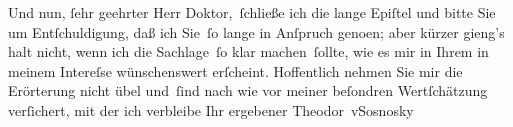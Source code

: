\pstart
           Und nun,{ }ſehr geehrter Herr Doktor, ſchließe ich die lange Epiſtel und bitte Sie um
               Entſchuldigung, daß ich Sie ſo lange in Anſpruch geno{\geminationm}en; aber kürzer gieng’s halt nicht, wenn ich die Sachlage ſo klar machen ſollte,
               wie es mir in Ihrem {\kaufmannsund} in meinem Intereſse wünschenswert
               erſcheint. Hoffentlich nehmen Sie mir die Erörterung nicht übel und ſind nach wie vor
               meiner beſondren Wertſchätzung verſichert, mit der ich verbleibe Ihr ergebener\pend
           \pstart \spacefill\mbox{Theodor vSosnosky}\pend{}\endnumbering{}
\begin{anhang}
\end{anhang}\newcommand{\dateiname}{L04231}\newcommand{\titel}{Theodor von Sosnosky an Arthur Schnitzler, 26. 5. 1901}\newcommand{\editorInnen}{Herausgegeben von Jahnke, SelmaMüller, Martin Anton}
